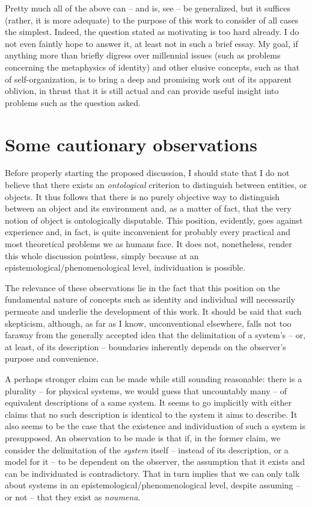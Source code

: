 \documentclass[12pt, a4paper]{article} %
\theoremstyle{definition}
\begin{document}
	Pretty much all of the above can -- and is, see \cite{Chan2019, Chan2020} -- be generalized, but it suffices (rather, it is more adequate) to the purpose of this work to consider of all cases the simplest. Indeed, the question stated as motivating is too hard already. I do not even faintly hope to answer it, at least not in such a brief essay. My goal, if anything more than briefly digress over millennial issues (such as problems concerning the metaphysics of identity) and other elusive concepts, such as that of self-organization, is to bring a deep and promising work \cite{Thom1982} out of its apparent oblivion, in thrust that it is still actual and can provide useful insight into problems such as the question asked.
	
	\section{Some cautionary observations}
	
	Before properly starting the proposed discussion, I should state that I do not believe that there exists an \textit{ontological} criterion to distinguish between entities, or objects. It thus follows that there is no purely objective way to distinguish between an object and its environment and, as a matter of fact, that the very notion of object is ontologically disputable. This position, evidently, goes against experience and, in fact, is quite inconvenient for probably every practical and most theoretical problems we as humans face. It does not, nonetheless, render this whole discussion pointless, simply because at an epistemological/phenomenological level, individuation is possible.
	
	The relevance of these observations lie in the fact that this position on the fundamental nature of concepts such as identity and individual will necessarily permeate and underlie the development of this work. It should be said that such skepticism, although, as far as I know, unconventional elsewhere, falls not too faraway from the generally accepted idea that the delimitation of a system's -- or, at least, of its description -- boundaries inherently depends on the observer's purpose and convenience. 
	
	A perhaps stronger claim can be made while still sounding reasonable: there is a plurality -- for physical systems, we would guess that uncountably many -- of equivalent descriptions of a same system. It seems to go implicitly with either claims that no such description is identical to the system it aims to describe. It also seems to be the case that the existence and individuation of such a system is presupposed. An observation to be made is that if, in the former claim, we consider the delimitation of the \textit{system} itself -- instead of its description, or a model for it -- to be dependent on the observer, the assumption that it exists and can be individuated is contradictory. That in turn implies that we can only talk about systems in an epistemological/phenomenological level, despite assuming -- or not -- that they exist as \textit{noumena}.
	
\end{document}
